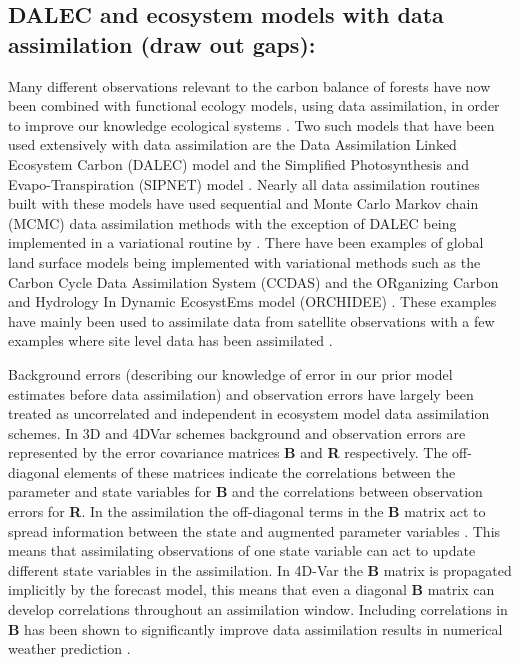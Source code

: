 \documentclass[11pt]{article}
\begin{document}
\subsection{DALEC and ecosystem models with data assimilation (draw out gaps):}
Many different observations relevant to the carbon balance of forests have now been combined with functional ecology models, using data assimilation, in order to improve our knowledge ecological systems \citep{zobitz2011primer, fox2009reflex, richardson2010estimating, Quaife2008, Zobitz2014, Niu2014}. Two such models that have been used extensively with data assimilation are the Data Assimilation Linked Ecosystem Carbon (DALEC) model \citep{williams2005improved} and the Simplified Photosynthesis and Evapo-Transpiration (SIPNET) model \citep{braswell2005estimating}. Nearly all data assimilation routines built with these models have used sequential and Monte Carlo Markov chain (MCMC) data assimilation methods with the exception of DALEC being implemented in a variational routine by \citet{delahaies2013regularization}. There have been examples of global land surface models being implemented with variational methods such as the Carbon Cycle Data Assimilation System (CCDAS) \citep{Kaminski2013} and the ORganizing Carbon and Hydrology In Dynamic EcosystEms model (ORCHIDEE) \citep{Krinner2005}. These examples have mainly been used to assimilate data from satellite observations with a few examples where site level data has been assimilated \citep{Verbeeck2011, Bacour2015}.

Background errors (describing our knowledge of error in our prior model estimates before data assimilation) and observation errors have largely been treated as uncorrelated and independent in ecosystem model data assimilation schemes. In 3D and 4DVar schemes background and observation errors are represented by the error covariance matrices \textbf{B} and \textbf{R} respectively. The off-diagonal elements of these matrices indicate the correlations between the parameter and state variables for \textbf{B} and the correlations between observation errors for \textbf{R}. In the assimilation the off-diagonal terms in the \textbf{B} matrix act to spread information between the state and augmented parameter variables \citep{kalnay2003atmospheric}. This means that assimilating observations of one state variable can act to update different state variables in the assimilation. In 4D-Var the \textbf{B} matrix is propagated implicitly by the forecast model, this means that even a diagonal \textbf{B} matrix can develop correlations throughout an assimilation window. Including correlations in \textbf{B} has been shown to significantly improve data assimilation results in numerical weather prediction \citep{bannister2008review}. 
\end{document}
